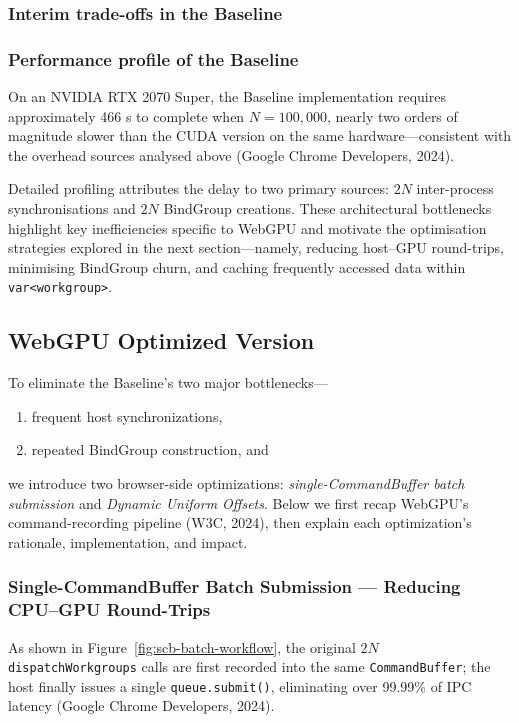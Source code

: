 \documentclass[PhD]{PHlab-thesis}
\begin{document}
\subsubsection{Interim trade-offs in the Baseline}

\subsubsection{Performance profile of the Baseline}
On an NVIDIA RTX 2070 Super, the Baseline implementation requires approximately 466 s to complete when $N = 100{,}000$, nearly two orders of magnitude slower than the CUDA version on the same hardware—consistent with the overhead sources analysed above (Google Chrome Developers, 2024).

Detailed profiling attributes the delay to two primary sources: $2N$ inter-process synchronisations and $2N$ BindGroup creations. These architectural bottlenecks highlight key inefficiencies specific to WebGPU and motivate the optimisation strategies explored in the next section—namely, reducing host–GPU round-trips, minimising BindGroup churn, and caching frequently accessed data within \texttt{var<workgroup>}.



\subsection{WebGPU Optimized Version}
To eliminate the Baseline's two major bottlenecks—
\begin{enumerate}
    \item frequent host synchronizations,
    \item repeated BindGroup construction, and
\end{enumerate}
we introduce two browser-side optimizations: \emph{single-CommandBuffer batch submission} and \emph{Dynamic Uniform Offsets}. Below we first recap WebGPU's command-recording pipeline (W3C, 2024), then explain each optimization's rationale, implementation, and impact.

\subsubsection{Single-CommandBuffer Batch Submission — Reducing CPU–GPU Round-Trips}
As shown in Figure~\ref{fig:scb-batch-workflow}, the original $2N$ \texttt{dispatchWorkgroups} calls are first recorded into the same \texttt{CommandBuffer}; the host finally issues a single \texttt{queue.submit()}, eliminating over 99.99\% of IPC latency (Google Chrome Developers, 2024).
\end{document}
